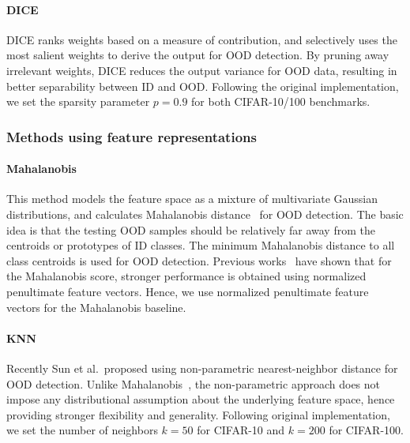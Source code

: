 \documentclass[letterpaper]{article} %
\def\etal{{et al.\xspace}}
\theoremstyle{plain}
\theoremstyle{definition}
\theoremstyle{remark}
\begin{document}
\paragraph{DICE~\cite{sun2022dice}} DICE ranks weights based on a measure of contribution, and selectively uses the most salient weights to derive the output for OOD detection. By pruning away irrelevant weights, DICE reduces the output variance for OOD
data, resulting in better separability between ID and OOD. Following the original implementation, we set the sparsity parameter $p = 0.9$ for both CIFAR-10/100 benchmarks.

\subsubsection{Methods using feature representations}

\paragraph{Mahalanobis \cite{lee2018simple}} This method models the feature space as a mixture of multivariate Gaussian distributions, and calculates Mahalanobis distance~\cite{mahalanobis1936generalized} for OOD detection. The basic idea is that the testing OOD samples should be relatively far away from the centroids or prototypes of ID classes. The minimum Mahalanobis distance to all class centroids is used for OOD detection. Previous works~\cite{sun2022knn, 2021ssd} have shown that for the Mahalanobis score, stronger performance is obtained using normalized penultimate feature vectors. Hence, we use normalized penultimate feature vectors for the Mahalanobis baseline.


\paragraph{KNN~\cite{sun2022knn}} Recently Sun \etal~proposed using non-parametric nearest-neighbor distance
for OOD detection. Unlike Mahalanobis~\cite{lee2018simple}, the non-parametric approach does not impose any distributional assumption about the underlying feature space, hence providing stronger
flexibility and generality. Following original implementation, we set the number of neighbors $k=50$ for CIFAR-10 and $k=200$ for CIFAR-100.
\end{document}
